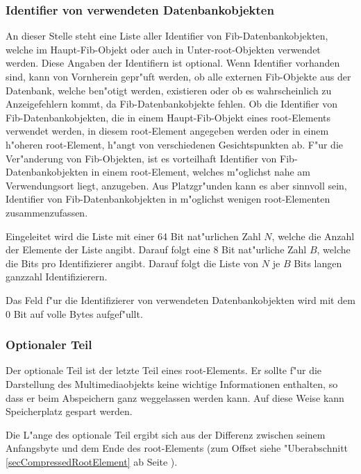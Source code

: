 \subsubsection{Identifier von verwendeten Datenbankobjekten}
\label{secCompressedRootDBIdentifier}

An dieser Stelle steht eine Liste aller Identifier von Fib-Datenbankobjekten, welche im Haupt-Fib-Objekt oder auch in Unter-root-Objekten verwendet werden. Diese Angaben der Identifiern ist optional. Wenn Identifier vorhanden sind, kann von Vornherein gepr"uft werden, ob alle externen Fib-Objekte aus der Datenbank, welche ben"otigt werden, existieren oder ob es wahrscheinlich zu Anzeigefehlern kommt, da Fib-Datenbankobjekte fehlen. Ob die Identifier von Fib-Datenbankobjekten, die in einem Haupt-Fib-Objekt eines root-Elements verwendet werden, in diesem root-Element angegeben werden oder in einem h"oheren root-Element, h"angt von verschiedenen Gesichtspunkten ab. F"ur die Ver"anderung von Fib-Objekten, ist es vorteilhaft Identifier von Fib-Datenbankobjekten in einem root-Element, welches m"oglichst nahe am Verwendungsort liegt, anzugeben. Aus Platzgr"unden kann es aber sinnvoll sein, Identifier von Fib-Datenbankobjekten in m"oglichst wenigen root-Elementen zusammenzufassen.

Eingeleitet wird die Liste mit einer 64 Bit nat"urlichen Zahl $N$, welche die Anzahl der Elemente der Liste angibt. Darauf folgt eine 8 Bit nat"urliche Zahl $B$, welche die Bits pro Identifizierer angibt.
Darauf folgt die Liste von $N$ je $B$ Bits langen ganzzahl Identifizierern.

Das Feld f"ur die Identifizierer von verwendeten Datenbankobjekten wird mit dem 0 Bit auf volle Bytes aufgef"ullt.


\subsubsection{Optionaler Teil}
\label{secCompressedRootOptionalPart}

Der optionale Teil ist der letzte Teil eines root-Elements. Er sollte f"ur die Darstellung des Multimediaobjekts keine wichtige Informationen enthalten, so dass er beim Abspeichern ganz weggelassen werden kann. Auf diese Weise kann Speicherplatz gespart werden.

Die L"ange des optionale Teil ergibt sich aus der Differenz zwischen seinem Anfangsbyte und dem Ende des root-Elements (zum Offset siehe "Uberabschnitt \ref{secCompressedRootElement} ab Seite \pageref{secCompressedRootElement}).

